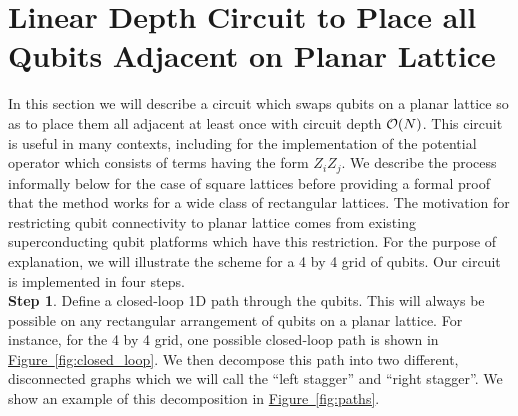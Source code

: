 \documentclass[superscriptaddress,aps,pra,nofootinbib,notitlepage,10pt,longbibliography]{revtex4-1}
\newcommand{\fig}[1]{\hyperref[fig:#1]{Figure~\ref*{fig:#1}}}
\begin{document}
\section{Linear Depth Circuit to Place all Qubits Adjacent on Planar Lattice}
\label{app:qubit_cycle}

In this section we will describe a circuit which swaps qubits on a planar lattice so as to place them all adjacent at least once with circuit depth ${\cal O}(N)$. This circuit is useful in many contexts, including for the implementation of the potential operator which consists of terms having the form $Z_i Z_j$. We describe the process informally below for the case of square lattices before providing a formal proof that the method works for a wide class of rectangular lattices. The motivation for restricting qubit connectivity to planar lattice comes from existing superconducting qubit platforms which have this restriction. For the purpose of explanation, we will illustrate the scheme for a 4 by 4 grid of qubits. Our circuit is implemented in four steps.\\

{\bf Step 1}. Define a closed-loop 1D path through the qubits. This will always be possible on any rectangular  arrangement of qubits on a planar lattice. For instance, for the 4 by 4 grid, one possible closed-loop path is shown in \fig{closed_loop}. We then decompose this path into two different, disconnected graphs which we will call the ``left stagger'' and ``right stagger''. We show an example of this decomposition in \fig{paths}.\\
\end{document}
